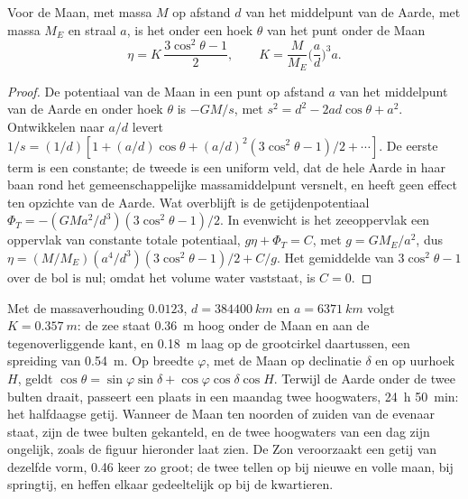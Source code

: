 \begin{theorem}\label{thm:b3:ocean-dynamics:equilibrium-tide}
Voor de Maan, met massa $M$ op afstand $d$ van het middelpunt van de Aarde, met
massa $M_E$ en straal $a$, is het  onder een hoek $\theta$ van
het punt onder de Maan
\[
\eta = K\,\frac{3\cos^2\theta - 1}{2},\qquad
K = \frac{M}{M_E}\Big(\frac{a}{d}\Big)^3 a .
\]
\end{theorem}

\begin{proof}
De potentiaal van de Maan in een punt op afstand $a$ van het middelpunt van de
Aarde en onder hoek $\theta$ is $-GM/s$, met $s^2 = d^2 - 2ad\cos\theta +
a^2$. Ontwikkelen naar $a/d$ levert $1/s = (1/d)[1 + (a/d)\cos\theta + (a/d)^2
(3\cos^2\theta - 1)/2 + \cdots]$. De eerste term is een constante; de tweede
is een uniform veld, dat de hele Aarde in haar baan rond het gemeenschappelijke
massamiddelpunt versnelt, en heeft geen effect ten opzichte van de Aarde. Wat
overblijft is de getijdenpotentiaal $\Phi_T = -(GMa^2/d^3)(3
\cos^2\theta - 1)/2$. In evenwicht is het zeeoppervlak een oppervlak van
constante totale potentiaal, $g\eta + \Phi_T = C$, met $g = GM_E/a^2$, dus
$\eta = (M/M_E)(a^4/d^3)(3\cos^2\theta - 1)/2 + C/g$. Het gemiddelde van
$3\cos^2\theta - 1$ over de bol is nul; omdat het volume water
vaststaat, is $C = 0$.
\end{proof}

Met de massaverhouding $0.0123$, $d = \qty{384400}{km}$ en $a =
\qty{6371}{km}$ volgt $K = \qty{0.357}{m}$: de zee staat \qty{0.36}{m}
hoog onder de Maan en aan de tegenoverliggende kant, en \qty{0.18}{m} laag op
de grootcirkel daartussen, een spreiding van \qty{0.54}{m}. Op breedte $\varphi$,
met de Maan op declinatie $\delta$ en op uurhoek $H$, geldt $\cos\theta =
\sin\varphi\sin\delta + \cos\varphi\cos\delta\cos H$. Terwijl de Aarde
onder de twee bulten draait, passeert een plaats in een maandag twee hoogwaters,
\qty{24}{h} \qty{50}{min}: het halfdaagse getij. Wanneer de Maan
ten noorden of zuiden van de evenaar staat, zijn de twee bulten gekanteld, en de
twee hoogwaters van een dag zijn ongelijk, zoals de figuur hieronder laat zien. De Zon
veroorzaakt een getij van dezelfde vorm, \num{0.46} keer zo groot; de twee tellen op bij nieuwe
en volle maan, bij springtij, en heffen elkaar gedeeltelijk op bij de kwartieren.

